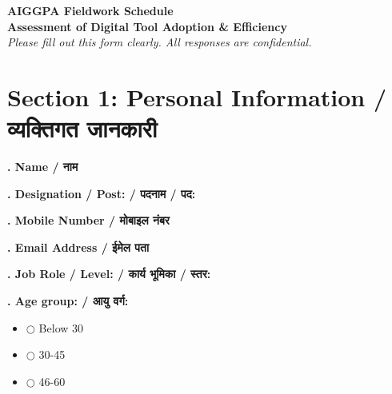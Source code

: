 \documentclass[11pt,a4paper]{article}
\newcounter{qcounter}
\begin{document}
\begin{center}
    {\LARGE \bfseries \color{primary} AIGGPA Fieldwork Schedule} \\ \vspace{0.2cm}
    {\Large \bfseries Assessment of Digital Tool Adoption \& Efficiency} \\ \vspace{0.2cm}
    \textit{Please fill out this form clearly. All responses are confidential.}
\end{center}
\vspace{0.5cm}


\section*{Section 1: Personal Information / व्यक्तिगत जानकारी}
\vspace{0.2cm}
\textbf{. Name / नाम}
\vspace{0.1cm}
\vspace{0.2cm}
\hrulefill
\vspace{0.4cm}

\textbf{. Designation / Post: / पदनाम / पद:}
\vspace{0.1cm}
\vspace{0.2cm}
\hrulefill
\vspace{0.4cm}

\textbf{. Mobile Number / मोबाइल नंबर}
\vspace{0.1cm}
\vspace{0.2cm}
\hrulefill
\vspace{0.4cm}

\textbf{. Email Address / ईमेल पता}
\vspace{0.1cm}
\vspace{0.2cm}
\hrulefill
\vspace{0.4cm}

\textbf{. Job Role / Level: / कार्य भूमिका / स्तर:}
\vspace{0.1cm}
\vspace{0.2cm}
\hrulefill
\vspace{0.4cm}

\textbf{. Age group: / आयु वर्ग:}
\vspace{0.1cm}
\begin{itemize}[label=, itemsep=0.1cm, leftmargin=0.5cm]
    \item $\bigcirc$ Below 30
    \item $\bigcirc$ 30-45
    \item $\bigcirc$ 46-60
\end{itemize}
\vspace{0.2cm}
\end{document}
